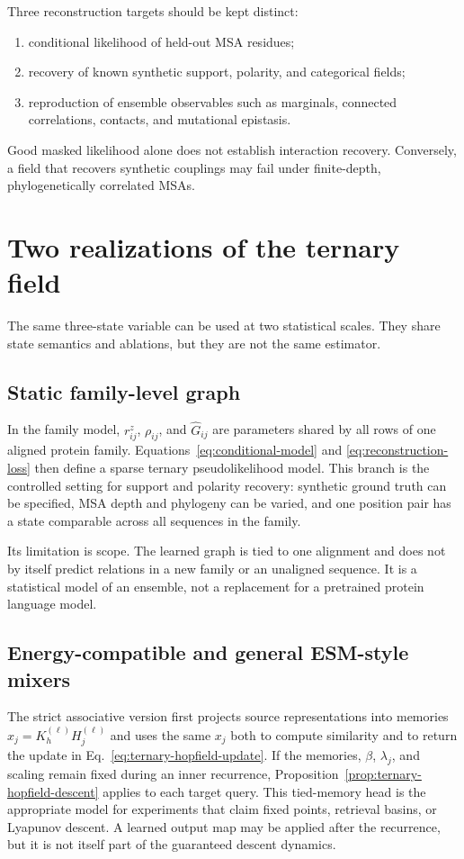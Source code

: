 \documentclass[10pt,twocolumn]{article}
\newcommand{\1}{\mathbf 1}
\theoremstyle{remark}
\begin{document}
Three reconstruction targets should be kept distinct:
\begin{enumerate}
\item conditional likelihood of held-out MSA residues;
\item recovery of known synthetic support, polarity, and categorical fields;
\item reproduction of ensemble observables such as marginals, connected correlations, contacts,
and mutational epistasis.
\end{enumerate}
Good masked likelihood alone does not establish interaction recovery.  Conversely, a field that
recovers synthetic couplings may fail under finite-depth, phylogenetically correlated MSAs.

\section{Two realizations of the ternary field}

The same three-state variable can be used at two statistical scales.  They share state semantics
and ablations, but they are not the same estimator.

\subsection{Static family-level graph}

In the family model, $r_{ij}^{z}$, $\rho_{ij}$, and $\widehat G_{ij}$ are parameters shared by all
rows of one aligned protein family.  Equations~\ref{eq:conditional-model} and
\ref{eq:reconstruction-loss} then define a sparse ternary pseudolikelihood model.  This branch is
the controlled setting for support and polarity recovery: synthetic ground truth can be specified,
MSA depth and phylogeny can be varied, and one position pair has a state comparable across all
sequences in the family.

Its limitation is scope.  The learned graph is tied to one alignment and does not by itself predict
relations in a new family or an unaligned sequence.  It is a statistical model of an ensemble, not
a replacement for a pretrained protein language model.

\subsection{Energy-compatible and general ESM-style mixers}

The strict associative version first projects source representations into memories
$x_j=K_h^{(\ell)}H_j^{(\ell)}$ and uses the same $x_j$ both to compute similarity and to return the
update in Eq.~\ref{eq:ternary-hopfield-update}.  If the memories, $\beta$, $\lambda_j$, and scaling
remain fixed during an inner recurrence, Proposition~\ref{prop:ternary-hopfield-descent} applies to
each target query.  This tied-memory head is the appropriate model for experiments that claim
fixed points, retrieval basins, or Lyapunov descent.  A learned output map may be applied after the
recurrence, but it is not itself part of the guaranteed descent dynamics.
\end{document}

